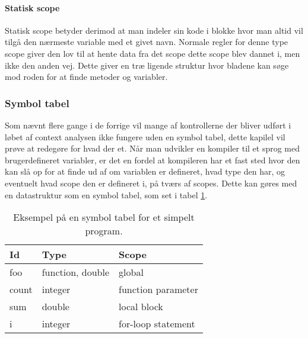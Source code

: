     \paragraph{Statisk scope} Statisk scope betyder derimod at man indeler sin kode i blokke hvor man altid vil tilgå den nærmeste variable med et givet navn. Normale regler for denne type scope giver den lov til at hente data fra det scope dette scope blev dannet i, men ikke den anden vej. Dette giver en træ ligende struktur hvor bladene kan søge mod roden for at finde metoder og variabler.


    
    
\subsubsection{Symbol tabel}
    Som nævnt flere gange i de forrige vil mange af kontrollerne der bliver udført i løbet af context analysen ikke fungere uden en symbol tabel, dette kapilel vil prøve at redegøre for hvad der et. Når man udvikler en kompiler til et sprog med brugerdefineret variabler, er det en fordel at kompileren har et fast sted hvor den kan slå op for at finde ud af om variablen er defineret, hvad type den har, og eventuelt hvad scope den er defineret i, på tværs af scopes. Dette kan gøres med en datastruktur som en symbol tabel, som set i tabel \ref{tab:symboltabel}.
    

    \begin{table}[H]
    \centering\footnotesize
    \begin{tabular}{l|l|l}
    Id & Type & Scope \\\midrule
    foo & function, double & global\\
    count & integer & function parameter\\
    sum & double & local block\\
    i & integer & for-loop statement
    \end{tabular}
    \caption{Eksempel på en symbol tabel for et simpelt program.}
    \label{tab:symboltabel}
    \end{table}
    
